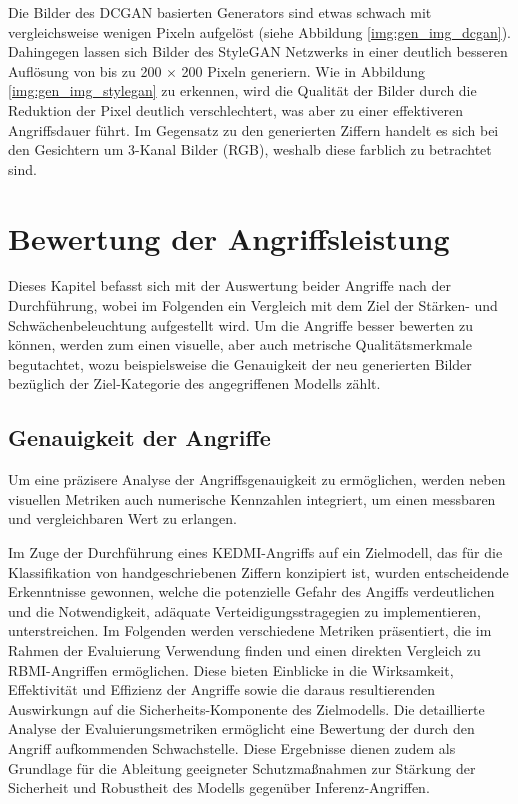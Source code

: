 Die Bilder des DCGAN basierten Generators sind etwas schwach mit vergleichsweise wenigen Pixeln aufgelöst (siehe Abbildung \ref{img:gen_img_dcgan}). Dahingegen lassen sich Bilder des StyleGAN Netzwerks in einer deutlich besseren Auflösung von bis zu 200 $\times$ 200 Pixeln generiern. Wie in Abbildung \ref{img:gen_img_stylegan} zu erkennen, wird die Qualität der Bilder durch die Reduktion der Pixel deutlich verschlechtert, was aber zu einer effektiveren Angriffsdauer führt. Im Gegensatz zu den generierten Ziffern handelt es sich bei den Gesichtern um 3-Kanal Bilder (RGB), weshalb diese farblich zu betrachtet sind.
\section{Bewertung der Angriffsleistung}
Dieses Kapitel befasst sich mit der Auswertung beider Angriffe nach der Durchführung, wobei im Folgenden ein Vergleich mit dem Ziel der Stärken- und Schwächenbeleuchtung aufgestellt wird. Um die Angriffe besser bewerten zu können, werden zum einen visuelle, aber auch metrische Qualitätsmerkmale begutachtet, wozu beispielsweise die Genauigkeit der neu generierten Bilder bezüglich der Ziel-Kategorie des \glqq angegriffenen\grqq{} Modells zählt.
\subsection{Genauigkeit der Angriffe}
Um eine präzisere Analyse der Angriffsgenauigkeit zu ermöglichen, werden neben visuellen Metriken auch numerische Kennzahlen integriert, um einen messbaren und vergleichbaren Wert zu erlangen.

Im Zuge der Durchführung eines \glqq KEDMI\grqq-Angriffs auf ein Zielmodell, das für die Klassifikation von handgeschriebenen Ziffern konzipiert ist, wurden entscheidende Erkenntnisse gewonnen, welche die potenzielle Gefahr des Angiffs verdeutlichen und die Notwendigkeit, adäquate Verteidigungsstragegien zu implementieren, unterstreichen. Im Folgenden werden verschiedene Metriken präsentiert, die im Rahmen der Evaluierung Verwendung finden und einen direkten Vergleich zu \glqq RBMI\grqq-Angriffen ermöglichen. Diese bieten Einblicke in die Wirksamkeit, Effektivität und Effizienz der Angriffe sowie die daraus resultierenden Auswirkungn auf die Sicherheits-Komponente des Zielmodells. Die detaillierte Analyse der Evaluierungsmetriken ermöglicht eine Bewertung der durch den Angriff aufkommenden Schwachstelle. Diese Ergebnisse dienen zudem als Grundlage für die Ableitung geeigneter Schutzmaßnahmen zur Stärkung der Sicherheit und Robustheit des Modells gegenüber Inferenz-Angriffen.

